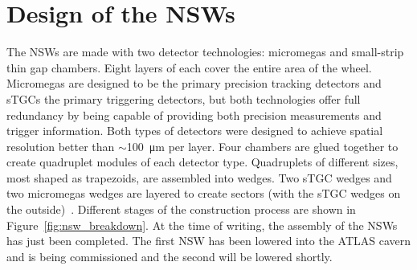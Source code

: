 \section{Design of the NSWs}

The NSWs are made with two detector technologies: micromegas and small-strip thin gap chambers. Eight layers of each cover the entire area of the wheel. Micromegas are designed to be the primary precision tracking detectors and sTGCs the primary triggering detectors, but both technologies offer full redundancy by being capable of providing both precision measurements and trigger information. Both types of detectors were designed to achieve spatial resolution better than $\sim$\SI{100}{\micro\meter} per layer. Four chambers are glued together to create quadruplet modules of each detector type. Quadruplets of different sizes, most shaped as trapezoids, are assembled into wedges. Two sTGC wedges and two micromegas wedges are layered to create sectors (with the sTGC wedges on the outside)~\cite{nsw_tdr}. Different stages of the construction process are shown in Figure~\ref{fig:nsw_breakdown}. At the time of writing, the assembly of the NSWs has just been completed. The first NSW has been lowered into the ATLAS cavern and is being commissioned and the second will be lowered shortly. 




